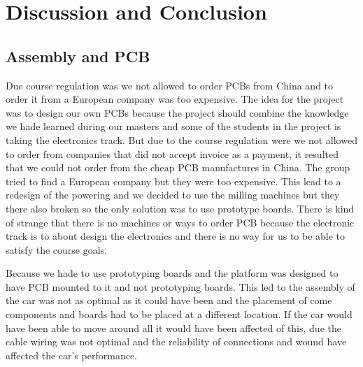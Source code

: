 \documentclass[11pt, titlepage]{article} %
\begin{document}
\clearpage
\section{Discussion and Conclusion}

\subsection{Assembly and PCB}
Due course regulation was we not allowed to order PCBs from China and to order it from a European company was too expensive. 
The idea for the project was to design our own PCBs because the project should combine the knowledge we hade learned during our masters and some of the students in the project is taking the electronics track. But due to the course regulation were we not allowed to order from companies that did not accept invoice as a payment, it resulted that we could not order from the cheap PCB manufactures in China. The group tried to find a European company but they were too expensive. This lead to a redesign of the powering and we decided to use the milling machines but they there also broken so the only solution was to use prototype boards. There is kind of strange that there is no machines or ways to order PCB because the electronic track is to about design the electronics and there is no way for us to be able to satisfy the course goals. 

Because we hade to use prototyping boards and the platform was designed to have PCB mounted to it and not prototyping boards. This led to the assembly of the car was not as optimal as it could have been and the placement of come components and boards had to be placed at a different location. If the car would have been able to move around all it would have been affected of this, due the cable wiring was not optimal and the reliability of connections and wound have affected the car's performance. 




\clearpage
\end{document}
